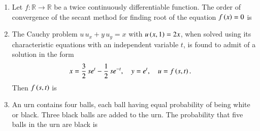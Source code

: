 \documentclass[journal,12pt,onecolumn]{IEEEtran}
\theoremstyle{remark}
\begin{document}
\begin{enumerate}[start=10]
\hfill{}
\begin{enumerate}
\end{enumerate}

\item Let $f\colon \mathbb{R} \to \mathbb{R}$ be a twice continuously differentiable function. The order of convergence of
the secant method for finding root of the equation $f\left(x\right) = 0$ is

\hfill{}
\begin{enumerate}
\end{enumerate}

\item The Cauchy problem $u\,u_x + y\,u_y = x$ with $u\left(x, 1\right) = 2x$, when solved using its characteristic
equations with an independent variable $t$, is found to admit of a solution in the form
\begin{align*}
x &= \frac{3}{2}\,s e^{t} - \frac{1}{2}\,s e^{-t},\quad
y = e^{t},\quad
u = f\left(s, t\right).
\end{align*}
Then $f\left(s, t\right)$ is

\hfill{}
\begin{enumerate}
\end{enumerate}

\item An urn contains four balls, each ball having equal probability of being white or black. Three
black balls are added to the urn. The probability that five balls in the urn are black is


\end{enumerate}
\end{document}
